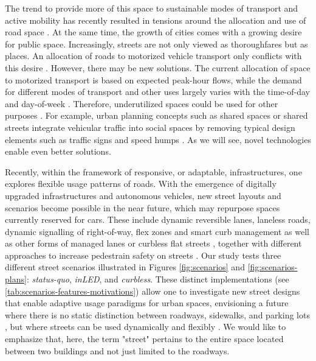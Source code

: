 The trend to provide more of this space to sustainable modes of transport and active mobility has recently resulted in tensions around the allocation and use of road space \cite{ITF2022}. At the same time, the growth of cities comes with a growing desire for public space. Increasingly, streets are not only viewed as thoroughfares but as places. An allocation of roads to motorized vehicle transport only conflicts with this desire \cite{vonSchoenfeldCities2017}. However, there may be new solutions. The current allocation of space to motorized transport is based on expected peak-hour flows, while the demand for different modes of transport and other uses largely varies with the time-of-day and day-of-week \cite{ITF2022}. Therefore, underutilized spaces could be used for other purposes \cite{ValencaJUrbMob_2021}. For example, urban planning concepts such as shared spaces or shared streets integrate vehicular traffic into social spaces by removing typical design elements such as traffic signs and speed humps \cite{HamiltonBaillieEnv2008}. As we will see, novel technologies enable even better solutions.

Recently, within the framework of responsive, or adaptable, infrastructures, one explores flexible usage patterns of roads. With the emergence of digitally upgraded infrastructures and autonomous vehicles, new street layouts and scenarios become possible in the near future, which may repurpose spaces currently reserved for cars\cite{Schlossberg2018}. These include dynamic reversible lanes\cite{Perez-Mendez2021}, laneless roads\cite{Papageorgiou2021}, dynamic signalling of right-of-way\cite{Ratti2018, Larrard2013}, flex zones and smart curb management\cite{Nacto2020} as well as other forms of managed lanes \cite{Schonhofer2022} or curbless flat streets \cite{Meyboom2018}, together with different approaches to increase pedestrain safety on streets \cite{Guo2023}. Our study tests three different street scenarios illustrated in Figures \ref{fig:scenarios} and \ref{fig:scenarios-plans}: \emph{status-quo}, \emph{inLED}, and \emph{curbless}. These distinct implementations (see \autoref{tab:scenarios-features-motivations}) allow one to investigate new street designs that enable adaptive usage paradigms for urban spaces, envisioning a future where there is no static distinction between roadways, sidewalks, and parking lots \cite{Kondor2020}, but where streets can be used dynamically and flexibly \cite{Rieland2018}.
We would like to emphasize that, here, the term "street" pertains to the entire space located between two buildings and not just limited to the roadways.

